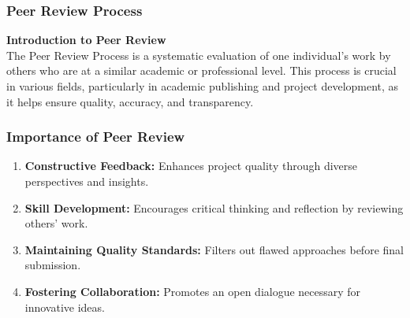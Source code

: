 \documentclass[aspectratio=169]{beamer}
\begin{document}
\begin{frame}[fragile]
  \frametitle{Peer Review Process}
  \textbf{Introduction to Peer Review} \\
  The Peer Review Process is a systematic evaluation of one individual's work by others who are at a similar academic or professional level. This process is crucial in various fields, particularly in academic publishing and project development, as it helps ensure quality, accuracy, and transparency.
\end{frame}

\begin{frame}[fragile]
  \frametitle{Importance of Peer Review}
  \begin{enumerate}
    \item \textbf{Constructive Feedback:} Enhances project quality through diverse perspectives and insights.
    \item \textbf{Skill Development:} Encourages critical thinking and reflection by reviewing others' work.
    \item \textbf{Maintaining Quality Standards:} Filters out flawed approaches before final submission.
    \item \textbf{Fostering Collaboration:} Promotes an open dialogue necessary for innovative ideas.
  \end{enumerate}
\end{frame}
\end{document}
